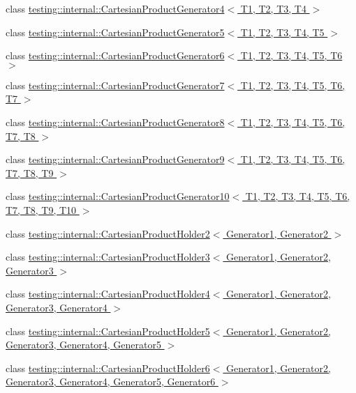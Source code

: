 \begin{DoxyCompactItemize}
\item 
class \hyperlink{classtesting_1_1internal_1_1_cartesian_product_generator4}{testing\-::internal\-::\-Cartesian\-Product\-Generator4$<$ T1, T2, T3, T4 $>$}
\item 
class \hyperlink{classtesting_1_1internal_1_1_cartesian_product_generator5}{testing\-::internal\-::\-Cartesian\-Product\-Generator5$<$ T1, T2, T3, T4, T5 $>$}
\item 
class \hyperlink{classtesting_1_1internal_1_1_cartesian_product_generator6}{testing\-::internal\-::\-Cartesian\-Product\-Generator6$<$ T1, T2, T3, T4, T5, T6 $>$}
\item 
class \hyperlink{classtesting_1_1internal_1_1_cartesian_product_generator7}{testing\-::internal\-::\-Cartesian\-Product\-Generator7$<$ T1, T2, T3, T4, T5, T6, T7 $>$}
\item 
class \hyperlink{classtesting_1_1internal_1_1_cartesian_product_generator8}{testing\-::internal\-::\-Cartesian\-Product\-Generator8$<$ T1, T2, T3, T4, T5, T6, T7, T8 $>$}
\item 
class \hyperlink{classtesting_1_1internal_1_1_cartesian_product_generator9}{testing\-::internal\-::\-Cartesian\-Product\-Generator9$<$ T1, T2, T3, T4, T5, T6, T7, T8, T9 $>$}
\item 
class \hyperlink{classtesting_1_1internal_1_1_cartesian_product_generator10}{testing\-::internal\-::\-Cartesian\-Product\-Generator10$<$ T1, T2, T3, T4, T5, T6, T7, T8, T9, T10 $>$}
\item 
class \hyperlink{classtesting_1_1internal_1_1_cartesian_product_holder2}{testing\-::internal\-::\-Cartesian\-Product\-Holder2$<$ Generator1, Generator2 $>$}
\item 
class \hyperlink{classtesting_1_1internal_1_1_cartesian_product_holder3}{testing\-::internal\-::\-Cartesian\-Product\-Holder3$<$ Generator1, Generator2, Generator3 $>$}
\item 
class \hyperlink{classtesting_1_1internal_1_1_cartesian_product_holder4}{testing\-::internal\-::\-Cartesian\-Product\-Holder4$<$ Generator1, Generator2, Generator3, Generator4 $>$}
\item 
class \hyperlink{classtesting_1_1internal_1_1_cartesian_product_holder5}{testing\-::internal\-::\-Cartesian\-Product\-Holder5$<$ Generator1, Generator2, Generator3, Generator4, Generator5 $>$}
\item 
class \hyperlink{classtesting_1_1internal_1_1_cartesian_product_holder6}{testing\-::internal\-::\-Cartesian\-Product\-Holder6$<$ Generator1, Generator2, Generator3, Generator4, Generator5, Generator6 $>$}

\end{DoxyCompactItemize}
